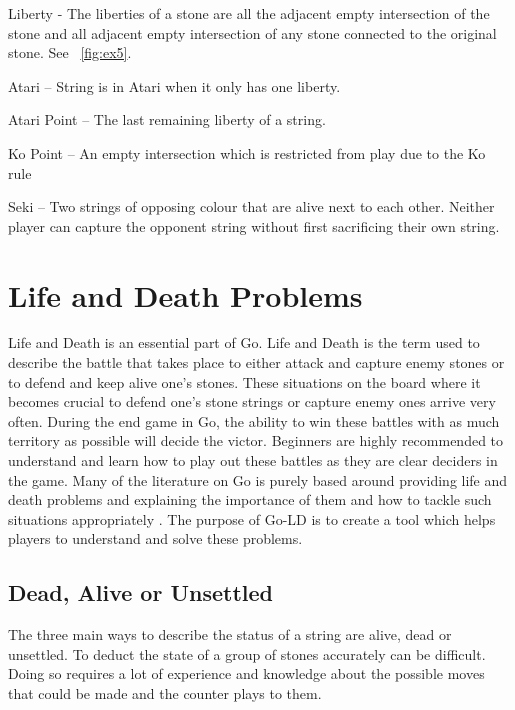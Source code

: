 \documentclass{l4proj}
\begin{document}
Liberty - The liberties of a stone are all the adjacent empty intersection of the stone and all adjacent empty intersection of any stone connected to the original stone. See ~\autoref{fig:ex5}.





Atari – String is in Atari when it only has one liberty.

Atari Point – The last remaining liberty of a string.

Ko Point –  An empty intersection which is restricted from play due to the Ko rule

Seki – Two strings of opposing colour that are alive next to each other. Neither player can capture the opponent string without first sacrificing their own string.





\section{Life and Death Problems}

Life and Death is an essential part of Go. Life and Death is the term used to describe the battle that takes place to either attack and capture enemy stones or to defend and keep alive one's stones.  These situations on the board where it becomes crucial to defend one’s stone strings or capture enemy ones arrive very often. During the end game in Go, the ability to win these battles with as much territory as possible will decide the victor. Beginners are highly recommended to understand and learn how to play out these battles as they are clear deciders in the game. Many of the literature on Go is purely based around providing life and death problems and explaining the importance of them and how to tackle such situations appropriately \citep{Cho1993}\citep{Davies1975}. The purpose of Go-LD is to create a tool which helps players to understand and solve these problems.

\subsection{Dead, Alive or Unsettled}

The three main ways to describe the status of a string are alive, dead or unsettled. To deduct the state of a group of stones accurately can be difficult. Doing so requires a lot of experience and knowledge about the possible moves that could be made and the counter plays to them.
\end{document}
